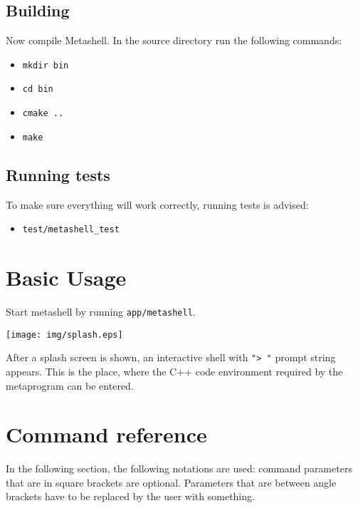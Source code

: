 \subsection{Building}

Now compile Metashell. In the source directory run the following commands:

\begin{itemize}
    \item \lstinline$mkdir bin$
    \item \lstinline$cd bin$
    \item \lstinline$cmake ..$
    \item \lstinline$make$
\end{itemize}

\subsection{Running tests}

To make sure everything will work correctly, running tests is advised:

\begin{itemize}
    \item \lstinline$test/metashell_test$
\end{itemize}

\section{Basic Usage}

Start metashell by running \lstinline$app/metashell$.

\texttt{[image: img/splash.eps]}

After a splash screen is shown, an interactive shell with \lstinline$"> "$
prompt string appears. This is the place, where the C++ code environment
required by the metaprogram can be entered.



\section{Command reference}

In the following section, the following notations are used: command parameters
that are in square brackets are optional. Parameters that are between angle
brackets have to be replaced by the user with something.



